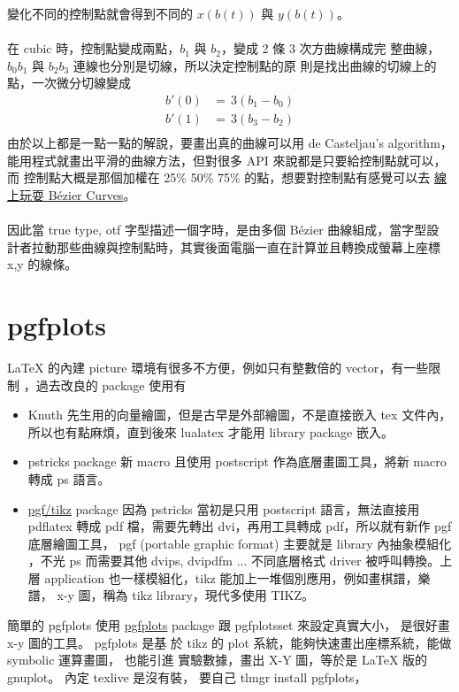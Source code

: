   變化不同的控制點就會得到不同的 $x(b(t))$ 與 $y(b(t))$。
  \\\\
  在 cubic 時，控制點變成兩點，$b_{1}$ 與 $b_{2}$，變成 2 條 3 次方曲線構成完
  整曲線，$b_{0} b_{1}$ 與 $b_{2} b_{3}$ 連線也分別是切線，所以決定控制點的原
  則是找出曲線的切線上的點，一次微分切線變成
  \[
    \begin{array}{cl}
      b'(0)&=\, 3(b_{1} - b_{0})\\
      b'(1)&=\, 3(b_{3} - b_{2})\\
    \end{array}
  \]
  由於以上都是一點一點的解說，要畫出真的曲線可以用 de Casteljau's algorithm，
  能用程式就畫出平滑的曲線方法，但對很多 API 來說都是只要給控制點就可以，而
  控制點大概是那個加權在 25\% 50\% 75\% 的點，想要對控制點有感覺可以去
  \href{https://www.desmos.com/calculator/cahqdxeshd}
  {線上玩耍 Bézier Curves}。
  \\\\
  因此當 true type, otf 字型描述一個字時，是由多個 Bézier 曲線組成，當字型設
  計者拉動那些曲線與控制點時，其實後面電腦一直在計算並且轉換成螢幕上座標x,y
  的線條。

\section{pgfplots}
\LaTeX{} 的內建 picture 環境有很多不方便，例如只有整數倍的 vector，有一些限制
，過去改良的 package 使用有

\begin{itemize}
  \item \MP{} Knuth 先生用的向量繪圖，但是古早是外部繪圖，不是直接嵌入 tex
    文件內，所以也有點麻煩，直到後來 lualatex 才能用 library package 嵌入。
  \item pstricks package 新 macro 且使用 postscript 作為底層畫圖工具，將新
    macro 轉成 ps 語言。
  \item \href{https://ctan.org/pkg/pgf?lang=en}{pgf/tikz} package
    因為 pstricks 當初是只用 postscript 語言，無法直接用
    pdflatex 轉成 pdf 檔，需要先轉出 dvi，再用工具轉成 pdf，所以就有新作 pgf
    底層繪圖工具， pgf (portable graphic format) 主要就是 library 內抽象模組化
    ，不光 ps 而需要其他 dvips, dvipdfm ... 不同底層格式 driver 被呼叫轉換。上
    層 application 也一樣模組化，tikz 能加上一堆個別應用，例如畫棋譜，樂譜，
    x-y 圖，稱為 tikz library，現代多使用 TIKZ。
\end{itemize}
  
簡單的 pgfplots 使用 \href{https://ctan.org/pkg/pgfplots?lang=en}{pgfplots}
package 跟 pgfplotsset 來設定真實大小， 是很好畫 x-y 圖的工具。 pgfplots 是基
於 tikz 的 plot 系統，能夠快速畫出座標系統，能做 symbolic 運算畫圖， 也能引進
實驗數據，畫出 X-Y 圖，等於是 \LaTeX{} 版的 gnuplot。 內定 texlive 是沒有裝，
要自己 tlmgr install pgfplots，

